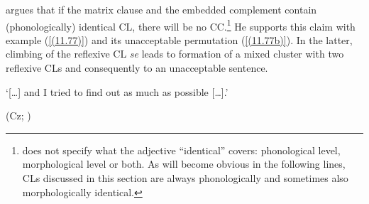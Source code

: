 \citet[79]{Junghanns02} argues that if the matrix clause and the embedded complement contain (phonologically) identical CL, there will be no CC.\footnote{\citet[79]{Junghanns02} does not specify what the adjective “identical” covers: phonological level, morphological level or both. As will become obvious in the following lines, CLs discussed in this section are always phonologically and sometimes also morphologically identical.} He supports this claim with example (\ref{(11.77)}) and its unacceptable permutation (\ref{(11.77b)}). In the latter, climbing of the reflexive CL \textit{se} leads to formation of a mixed cluster with two reflexive CLs and consequently to an unacceptable sentence.

\begin{exe}\ex
\begin{xlist}
\end{xlist}
\glt ‘[\dots] and I tried to find out as much as possible [\dots].’ \\
\strut\hfill (Cz; \citealt[79]{Junghanns02})
\end{exe}

